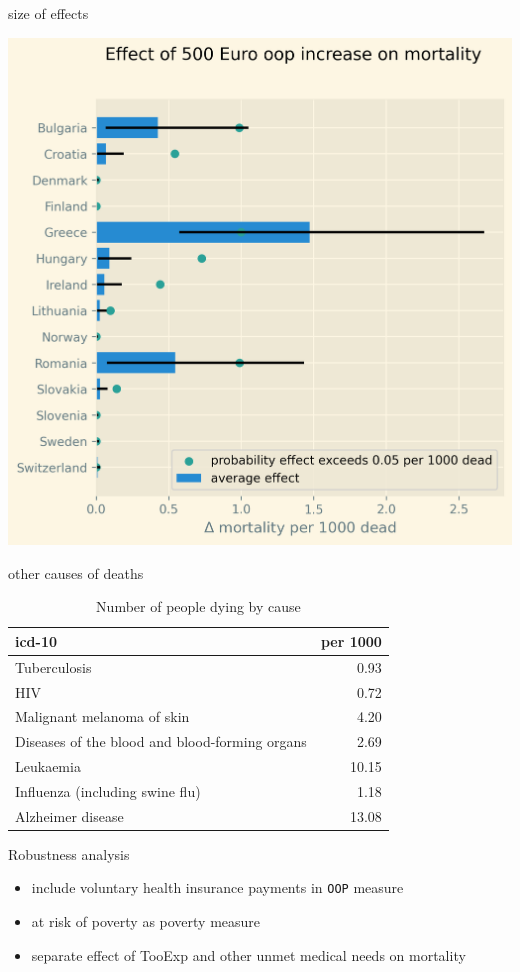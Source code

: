 \documentclass[presentation]{beamer}
\begin{document}
\begin{frame}[label={sec:org6b195c5}]{size of effects}
\begin{center}
\includegraphics[width=0.6\linewidth]{./figures/change_mortality_countries_baseline.png}
\label{fig:SummaryFigure}
\end{center}
\end{frame}


\begin{frame}[label={sec:orgd8e4a92}]{other causes of deaths}
\begin{table}[htbp]
\caption{\label{tab:causes_death}Number of people dying by cause}
\centering
\begin{tabular}{lr}
icd-10 & per 1000\\
\hline
Tuberculosis & 0.93\\
HIV & 0.72\\
Malignant melanoma of skin & 4.20\\
Diseases of the blood and blood-forming organs & 2.69\\
Leukaemia & 10.15\\
Influenza (including swine flu) & 1.18\\
Alzheimer disease & 13.08\\
\end{tabular}
\end{table}
\end{frame}


\begin{frame}[label={sec:orge4b05c8},fragile]{Robustness analysis}
 \begin{itemize}
\item include voluntary health insurance payments in \texttt{OOP} measure
\item at risk of poverty as poverty measure
\item separate effect of TooExp and other unmet medical needs on mortality
\end{itemize}
\end{frame}
\end{document}
